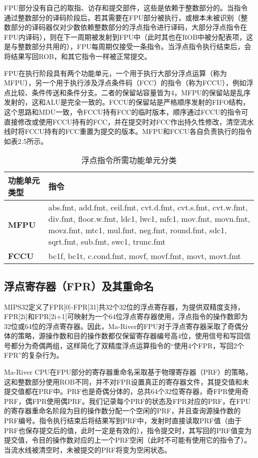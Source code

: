 FPU部分没有自己的取指、访存和提交部件，这些是依赖于整数部分的。当指令通过整数部分的译码阶段后，若其需要在FPU部分被执行，或根本未被识别（整数部分的译码器仅对少数依赖整数部分的浮点指令进行译码，大部分浮点指令在FPU内译码），则在下一周期被发射到FPU中（此时其也在ROB中被分配表项，这是与整数部分共用的），FPU每周期仅接受一条指令。当浮点指令执行结束后，会将结果写回ROB，和其它指令一样被正常提交。

FPU在执行阶段具有两个功能单元，一个用于执行大部分浮点运算（称为MFPU），另一个用于执行涉及浮点条件码（FCC）的指令（称为FCCU），例如浮点比较、条件传送和条件分支。二者的保留站容量皆为4，MFPU的保留站是乱序发射的，这和ALU是完全一致的。FCCU的保留站是严格顺序发射的FIFO结构，这个思路和MDU一致，令FCCU持有FCC的临时版本，顺序通过FCCU的指令可直接修改或使用FCCU持有的FCC，并在提交时对FCC作出持久性修改，清空流水线时将FCCU持有的FCC重置为提交的版本。MFPU和FCCU各自负责执行的指令如表2.5所示。

\begin{table}[htb]
\centering
\caption{浮点指令所需功能单元分类}
    \label{fig:enter-label}
\begin{tabular}{m{3.5cm}<{\centering}|m{7cm}<{\centering}}
\hline  %
\textbf{功能单元类型} & \textbf{指令}\\
\hline
\textbf{MFPU} & abs.fmt, add.fmt, ceil.fmt, cvt.d.fmt, cvt.s.fmt, cvt.w.fmt, div.fmt, floor.w.fmt, ldc1, lwc1, mfc1, mov.fmt, movn.fmt, movz.fmt, mtc1, mul.fmt, neg.fmt, round.fmt, sdc1, sqrt.fmt, sub.fmt, swc1, trunc.fmt \\
\hline
\textbf{FCCU} & bc1f, bc1t, c.cond.fmt, movf, movf.fmt, movt, movt.fmt \\
\hline
\end{tabular}

\end{table}

\subsection{浮点寄存器（FPR）及其重命名}

MIPS32定义了FPR[0]-FPR[31]共32个32位的浮点寄存器，为提供双精度支持，FPR[2i]和FPR[2i+1]可映射为一个64位浮点寄存器使用，浮点指令的操作数即为32位或64位的浮点寄存器。因此，Ma-River的FPU对于浮点寄存器采取了奇偶分体的策略，源操作数和目的操作数都仅保留寄存器编号高4位，使用信号和写回信号都分为奇偶两组，这样简化了双精度浮点运算指令的“使用4个FPR，写回2个FPR”的复杂行为。

Ma-River CPU在FPU部分的寄存器重命名采取基于物理寄存器（PRF）的策略，这和整数部分使用ROB不同，并不对FPR设置真正的寄存器文件，其提交值和未提交值都在PRF中。PRF也是奇偶分体的，总共64个32位寄存器，奇FPR使用奇PRF，偶FPR使用偶PRF。我们记录每个PRF的状态及FPR对应的PRF，在FPU的寄存器重命名阶段为目的操作数分配一个空闲的PRF，并且查询源操作数的PRF编号。指令执行结束后将结果写到PRF中，发射时直接读取PRF值（由于PRF也保存提交后的值，此时一定是有效的），指令提交时，其写回的PRF值变为提交值，令目的操作数对应的上一个PRF空闲（此时不可能有使用它的指令了）。当流水线被清空时，未被提交的PRF将变为空闲状态。

